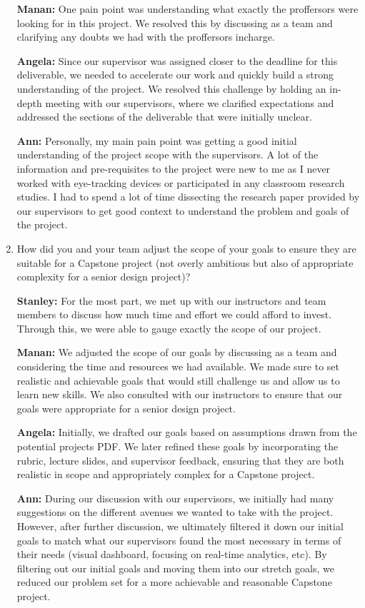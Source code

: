 \documentclass{article}
\begin{document}
\begin{enumerate}
\textbf{Manan:} One pain point was understanding what exactly the proffersors were looking for in this project. We resolved this by discussing as a team and clarifying any doubts we had with the proffersors incharge. 

\textbf{Angela:} Since our supervisor was assigned closer to the deadline for this deliverable, we needed to accelerate our work and quickly build a strong understanding of the project. We resolved this challenge by holding an in-depth meeting with our supervisors, where we clarified expectations and addressed the sections of the deliverable that were initially unclear.

\textbf{Ann:} Personally, my main pain point was getting a good initial understanding of the project scope with the supervisors. A lot of the information and pre-requisites to the project were new to me as I never worked with eye-tracking devices or participated in any classroom research studies. I had to spend a lot of time dissecting the research paper provided by our supervisors to get good context to understand the problem and goals of the project. 

    \item How did you and your team adjust the scope of your goals to ensure
    they are suitable for a Capstone project (not overly ambitious but also of
    appropriate complexity for a senior design project)?

\textbf{Stanley:} For the most part, we met up with our instructors and team members to discuss how much time and effort we could afford to invest. Through this, we were able to gauge exactly the scope of our project.  

\textbf{Manan:} We adjusted the scope of our goals by discussing as a team and considering the time and resources we had available. We made sure to set realistic and achievable goals that would still challenge us and allow us to learn new skills. We also consulted with our instructors to ensure that our goals were appropriate for a senior design project.

\textbf{Angela:} Initially, we drafted our goals based on assumptions drawn from the potential projects PDF. We later refined these goals by incorporating the rubric, lecture slides, and supervisor feedback, ensuring that they are both realistic in scope and appropriately complex for a Capstone project.

\textbf{Ann:} During our discussion with our supervisors, we initially had many suggestions on the different avenues we wanted to take with the project. However, after further discussion, we ultimately filtered it down our initial goals to match what our supervisors found the most necessary in terms of their needs (visual dashboard, focusing on real-time analytics, etc). By filtering out our initial goals and moving them into our stretch goals, we reduced our problem set for a more achievable and reasonable Capstone project. 

\end{enumerate}  
\end{document}
